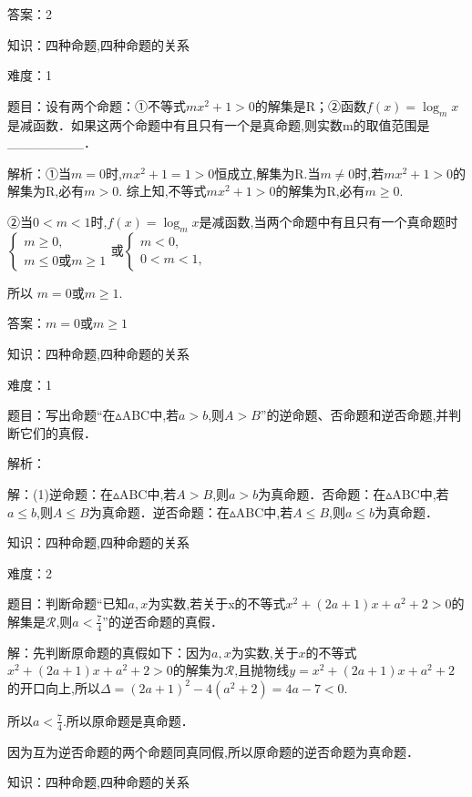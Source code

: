\documentclass{article} %
\begin{document}
答案：2



知识：四种命题,四种命题的关系

难度：1

题目：设有两个命题：①不等式$mx^{2}+1>0$的解集是R；②函数$f(x)=\log_{m}x$是减函数．如果这两个命题中有且只有一个是真命题,则实数m的取值范围是\_\_\_\_\_\_\_\_．

解析：①当$m=0$时,$mx^{2}+1=1>0$恒成立,解集为R.当$m\neq0$时,若$mx^{2}+1>0$的解集为R,必有$m>0$. 综上知,不等式$mx^{2}+1>0$的解集为R,必有$m\ge0$.

②当$0<m<1$时,$f(x)=\log_{m}x$是减函数,当两个命题中有且只有一个真命题时$\left\{
\begin{array}{l}
m \ge 0, \\
m \le 0 或 m\ge 1
\end{array}
\right.$或$\left\{
\begin{array}{l}
m<0, \\
0<m<1,
\end{array}
\right.$

所以 $m=0$或$m\ge1$.

答案：$m=0$或$m\ge1$



知识：四种命题,四种命题的关系

难度：1

题目：写出命题``在${\vartriangle}$ABC中,若$a>b$,则$A>B$''的逆命题、否命题和逆否命题,并判断它们的真假．

解析：

解：(1)逆命题：在${\vartriangle}$ABC中,若$A>B$,则$a>b$为真命题．否命题：在${\vartriangle}$ABC中,若$a\le b$,则$A\le B$为真命题．逆否命题：在${\vartriangle}$ABC中,若$A\le B$,则$a\le b$为真命题．



知识：四种命题,四种命题的关系

难度：2

题目：判断命题``已知$a,x$为实数,若关于x的不等式$x^{2}+(2a+1)x+a^{2}+2>0$的解集是$\mathcal{R}$,则$a<\frac{7}{4}$''的逆否命题的真假．

解：先判断原命题的真假如下：因为$a,x$为实数,关于$x$的不等式$x^{2}+(2a+1)x+a^{2}+2>0$的解集为$\mathcal{R}$,且抛物线$y=x^{2}+(2a+1)x+a^{2}+2$的开口向上,所以$\Delta=(2a+1)^{2}-4(a^{2}+2)=4a-7<0$.

所以$a<\frac{7}{4}$.所以原命题是真命题．

因为互为逆否命题的两个命题同真同假,所以原命题的逆否命题为真命题．



知识：四种命题,四种命题的关系
\end{document}

